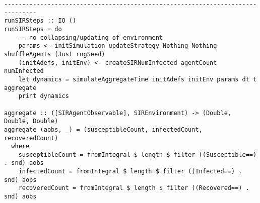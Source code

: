 \begin{verbatim}
-------------------------------------------------------------------------------
runSIRSteps :: IO ()
runSIRSteps = do
    -- no collapsing/updating of environment
    params <- initSimulation updateStrategy Nothing Nothing shuffleAgents (Just rngSeed)
    (initAdefs, initEnv) <- createSIRNumInfected agentCount numInfected
    let dynamics = simulateAggregateTime initAdefs initEnv params dt t aggregate
    print dynamics
	
aggregate :: ([SIRAgentObservable], SIREnvironment) -> (Double, Double, Double)
aggregate (aobs, _) = (susceptibleCount, infectedCount, recoveredCount)
  where
    susceptibleCount = fromIntegral $ length $ filter ((Susceptible==) . snd) aobs
    infectedCount = fromIntegral $ length $ filter ((Infected==) . snd) aobs
    recoveredCount = fromIntegral $ length $ filter ((Recovered==) . snd) aobs
\end{verbatim}